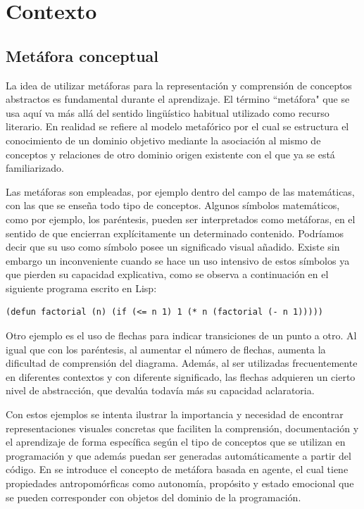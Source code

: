 \documentclass{llncs}
\begin{document}
%
%
\section{Contexto}
\label{sec:background}
\subsection{Metáfora conceptual}

La idea de utilizar metáforas para la representación y comprensión de conceptos abstractos es fundamental durante el aprendizaje. El término ``metáfora" que se usa aquí va más allá del sentido lingüístico habitual utilizado como recurso literario. En realidad se refiere al modelo metafórico por el cual se estructura el conocimiento de un dominio objetivo mediante la asociación al mismo de conceptos y relaciones de otro dominio origen existente con el que ya se está familiarizado. 

Las metáforas son empleadas, por ejemplo dentro del campo de las matemáticas, con las que se enseña todo tipo de conceptos. Algunos símbolos matemáticos, como por ejemplo, los paréntesis, pueden ser interpretados como metáforas, en el sentido de que encierran explícitamente un determinado contenido. Podríamos decir que su uso como símbolo posee un significado visual añadido. Existe sin embargo un inconveniente cuando se hace un uso intensivo de estos símbolos ya que pierden su capacidad explicativa, como se observa a continuación en el siguiente programa escrito en Lisp:

\begin{verbatim}
(defun factorial (n) (if (<= n 1) 1 (* n (factorial (- n 1)))))
\end{verbatim}

Otro ejemplo es el uso de flechas para indicar transiciones de un punto a otro. Al igual que con los paréntesis, al aumentar el número de flechas, aumenta la dificultad de comprensión del diagrama. Además, al ser utilizadas frecuentemente en diferentes contextos y con diferente significado, las flechas adquieren un cierto nivel de abstracción, que devalúa todavía más su capacidad aclaratoria. 

Con estos ejemplos se intenta ilustrar la importancia y necesidad de encontrar representaciones visuales concretas que faciliten la comprensión, documentación y el aprendizaje de forma específica según el tipo de conceptos que se utilizan en programación y que además puedan ser generadas automáticamente a partir del código. En \cite{travers1996programming} se introduce el concepto de metáfora basada en agente, el cual tiene propiedades antropomórficas como autonomía, propósito y estado emocional que se pueden corresponder con objetos del dominio de la programación.
\end{document}
